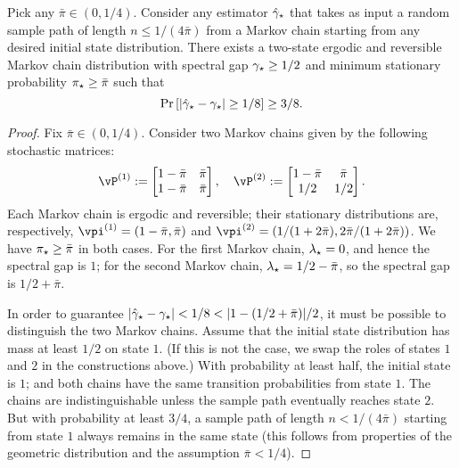 \begin{theorem}
  Pick any $\bar\pi \in (0,1/4)$.
  Consider any estimator $\hat\gamma_{\star}$ that takes as input a random sample
  path of length $n \leq 1/(4\bar\pi)$ from a Markov chain starting
  from any desired initial state distribution.
  There exists a two-state ergodic and reversible Markov chain
  distribution with spectral gap $\gamma_{\star} \geq 1/2$ and minimum
  stationary probability $\pi_{\star} \geq \bar\pi$ such that
  \[
    \Pr\left[ |\hat\gamma_{\star} - \gamma_{\star}| \geq 1/8 \right] \geq 3/8 .
  \]
\end{theorem}
\begin{proof}
  Fix $\bar\pi \in (0,1/4)$.
  Consider two Markov chains given by the following stochastic
  matrices:
  \[
    \vP^{(1)} :=
    \begin{bmatrix}
      1-\bar\pi & \bar\pi \\
      1-\bar\pi & \bar\pi
    \end{bmatrix}
    , \quad
    \vP^{(2)} :=
    \begin{bmatrix}
      1-\bar\pi & \bar\pi \\
      1/2 & 1/2
    \end{bmatrix}
    .
  \]
  Each Markov chain is ergodic and reversible; their stationary
  distributions are, respectively, $\vpi^{(1)} = (1-\bar\pi,\bar\pi)$
  and $\vpi^{(2)} = (1/(1+2\bar\pi),2\bar\pi/(1+2\bar\pi))$.
  We have $\pi_{\star} \geq \bar\pi$ in both cases.
  For the first Markov chain, $\lambda_{\star} = 0$, and hence the spectral gap
  is $1$; for the second Markov chain, $\lambda_{\star} = 1/2-\bar\pi$, so the
  spectral gap is $1/2+\bar\pi$.

  In order to guarantee $|\hat\gamma_{\star} - \gamma_{\star}| < 1/8 < |1 -
  (1/2+\bar\pi)|/2$, it must be possible to distinguish the two Markov
  chains.
  Assume that the initial state distribution has mass at least $1/2$
  on state $1$.
  (If this is not the case, we swap the roles of states $1$ and $2$ in
  the constructions above.)
  With probability at least half, the initial state is $1$; and both
  chains have the same transition probabilities from state $1$.
  The chains are indistinguishable unless the sample path eventually
  reaches state $2$.
  But with probability at least $3/4$, a sample path of length $n <
  1/(4\bar\pi)$ starting from state $1$ always remains in the same
  state (this follows from properties of the geometric distribution
  and the assumption $\bar\pi < 1/4$).
\end{proof}


